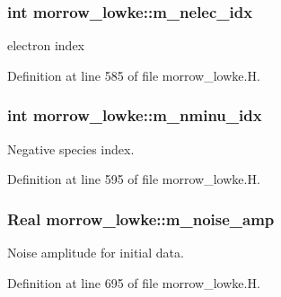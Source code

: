 \subsubsection[{\texorpdfstring{m\+\_\+nelec\+\_\+idx}{m_nelec_idx}}]{\setlength{\rightskip}{0pt plus 5cm}int morrow\+\_\+lowke\+::m\+\_\+nelec\+\_\+idx}\hypertarget{classmorrow__lowke_ac60d0a976425a8c6dfa660a7be9b198b}{}\label{classmorrow__lowke_ac60d0a976425a8c6dfa660a7be9b198b}


electron index 



Definition at line 585 of file morrow\+\_\+lowke.\+H.

\subsubsection[{\texorpdfstring{m\+\_\+nminu\+\_\+idx}{m_nminu_idx}}]{\setlength{\rightskip}{0pt plus 5cm}int morrow\+\_\+lowke\+::m\+\_\+nminu\+\_\+idx}\hypertarget{classmorrow__lowke_ade9274cb10c38f6b6165b7a78bc20ddc}{}\label{classmorrow__lowke_ade9274cb10c38f6b6165b7a78bc20ddc}


Negative species index. 



Definition at line 595 of file morrow\+\_\+lowke.\+H.

\subsubsection[{\texorpdfstring{m\+\_\+noise\+\_\+amp}{m_noise_amp}}]{\setlength{\rightskip}{0pt plus 5cm}Real morrow\+\_\+lowke\+::m\+\_\+noise\+\_\+amp}\hypertarget{classmorrow__lowke_a30c8b51a1b43a80d17cd9212d8ea9b0f}{}\label{classmorrow__lowke_a30c8b51a1b43a80d17cd9212d8ea9b0f}


Noise amplitude for initial data. 



Definition at line 695 of file morrow\+\_\+lowke.\+H.


